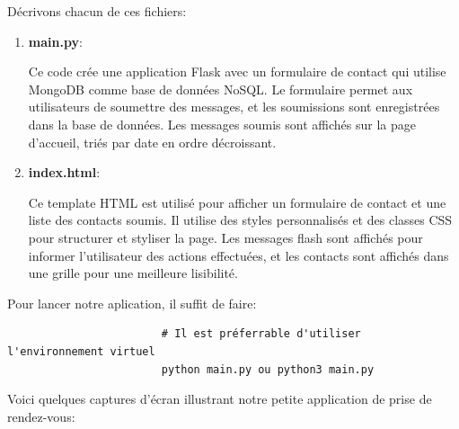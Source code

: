 \documentclass[a4paper,11pt]{article}
\begin{document}
                \noindent Décrivons chacun de ces fichiers:

                \begin{enumerate}
                    \item \textbf{main.py}:
                        
                        \noindent Ce code crée une application Flask avec un formulaire de contact qui utilise MongoDB comme base de données NoSQL. 
                        Le formulaire permet aux utilisateurs de soumettre des messages, et les soumissions sont enregistrées dans la base de données. 
                        Les messages soumis sont affichés sur la page d'accueil, triés par date en ordre décroissant.
                    \item  \textbf{index.html}:
                        

                        \noindent Ce template HTML est utilisé pour afficher un formulaire de contact et une liste des contacts soumis. 
                        Il utilise des styles personnalisés et des classes CSS pour structurer et styliser la page. Les messages flash sont affichés 
                        pour informer l'utilisateur des actions effectuées, et les contacts sont affichés dans une grille pour une meilleure lisibilité.
                \end{enumerate}

                \noindent Pour lancer notre aplication, il suffit de faire: 

                \begin{tcolorbox}[colback=lightgray!6, colframe=black, left=-30mm, right=5mm, top=2mm, bottom=2mm, boxrule=0.1mm]
                    \begin{verbatim}
                        # Il est préferrable d'utiliser l'environnement virtuel
                        python main.py ou python3 main.py
                    \end{verbatim}
                \end{tcolorbox}

                \noindent Voici quelques captures d'écran illustrant notre petite application de
                prise de rendez-vous:
\end{document}
